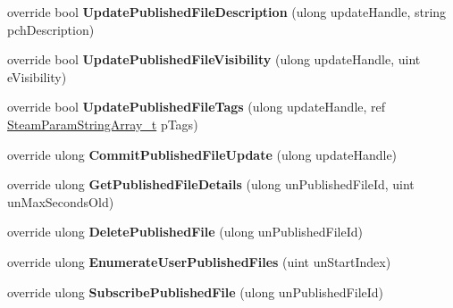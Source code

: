 \begin{DoxyCompactItemize}
override bool {\bfseries Update\+Published\+File\+Description} (ulong update\+Handle, string pch\+Description)
\item 
\mbox{\label{class_valve_1_1_steamworks_1_1_c_steam_remote_storage_acc6f86cfd55cbc99c4eeb23246d2c466}} 
override bool {\bfseries Update\+Published\+File\+Visibility} (ulong update\+Handle, uint e\+Visibility)
\item 
\mbox{\label{class_valve_1_1_steamworks_1_1_c_steam_remote_storage_aa9157042fd00695b6095d12b902e6f18}} 
override bool {\bfseries Update\+Published\+File\+Tags} (ulong update\+Handle, ref \hyperlink{struct_valve_1_1_steamworks_1_1_steam_param_string_array__t}{Steam\+Param\+String\+Array\+\_\+t} p\+Tags)
\item 
\mbox{\label{class_valve_1_1_steamworks_1_1_c_steam_remote_storage_ab5243ca4584e28ce6eaf3a998eecbe35}} 
override ulong {\bfseries Commit\+Published\+File\+Update} (ulong update\+Handle)
\item 
\mbox{\label{class_valve_1_1_steamworks_1_1_c_steam_remote_storage_af6adc7b88a5c8e6241ef40962466c245}} 
override ulong {\bfseries Get\+Published\+File\+Details} (ulong un\+Published\+File\+Id, uint un\+Max\+Seconds\+Old)
\item 
\mbox{\label{class_valve_1_1_steamworks_1_1_c_steam_remote_storage_a31d957600d98a97d22d1c3d3092f2782}} 
override ulong {\bfseries Delete\+Published\+File} (ulong un\+Published\+File\+Id)
\item 
\mbox{\label{class_valve_1_1_steamworks_1_1_c_steam_remote_storage_a71fc0ef784a6305434b98258cd71746e}} 
override ulong {\bfseries Enumerate\+User\+Published\+Files} (uint un\+Start\+Index)
\item 
\mbox{\label{class_valve_1_1_steamworks_1_1_c_steam_remote_storage_aeac3d0d8794722f361f5dc5b57f4dade}} 
override ulong {\bfseries Subscribe\+Published\+File} (ulong un\+Published\+File\+Id)

\end{DoxyCompactItemize}
